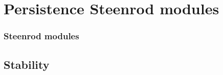 
\section{Persistence Steenrod modules}\label{s:steenrod}

\TBW



\subsubsection{Steenrod modules}\label{ss:steenrod}

\subsection{Stability}\label{ss:stability}

